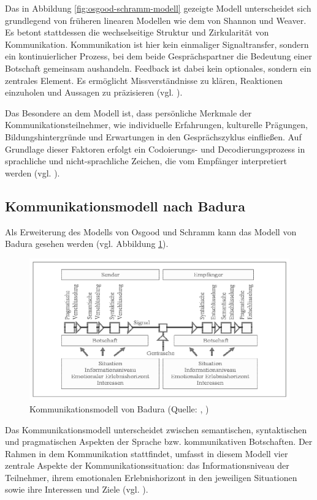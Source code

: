 Das in Abbildung \ref{fig:osgood-schramm-modell} gezeigte Modell unterscheidet sich grundlegend von früheren linearen Modellen wie dem von Shannon und Weaver. Es betont stattdessen die wechselseitige Struktur und Zirkularität von Kommunikation. Kommunikation ist hier kein einmaliger Signaltransfer, sondern ein kontinuierlicher Prozess, bei dem beide Gesprächspartner die Bedeutung einer Botschaft gemeinsam aushandeln. Feedback ist dabei kein optionales, sondern ein zentrales Element. Es ermöglicht Missverständnisse zu klären, Reaktionen einzuholen und Aussagen zu präzisieren (vgl. \citealp{kumar_osgood_2024}). 

Das Besondere an dem Modell ist, dass persönliche Merkmale der Kommunikationsteilnehmer, wie individuelle Erfahrungen, kulturelle Prägungen, Bildungshintergründe und Erwartungen in den Gesprächszyklus einfließen. Auf Grundlage dieser Faktoren erfolgt ein Codoierungs- und Decodierungsprozess in sprachliche und nicht-sprachliche Zeichen, die vom Empfänger interpretiert werden (vgl. \citealp{kumar_osgood_2024}). 

\subsection{Kommunikationsmodell nach Badura}
Als Erweiterung des Modells von Osgood und Schramm kann das Modell von Badura gesehen werden (vgl. Abbildung \ref{fig:badura-modell}).

\begin{figure}[ht]
\centering
\includegraphics[width=1\linewidth]{content/pictures/badura.PNG}
\caption{Kommunikationsmodell von Badura (Quelle: \cite{badura_kommunikation_1992}, \cite[S. 93]{scheufele_kommunikation_2007})}
\label{fig:badura-modell}
\end{figure}

Das Kommunikationsmodell unterscheidet zwischen semantischen, syntaktischen und pragmatischen Aspekten der Sprache bzw. kommunikativen Botschaften. Der Rahmen in dem Kommunikation stattfindet, umfasst in diesem Modell vier zentrale Aspekte der Kommunikationssituation: das Informationsniveau der Teilnehmer, ihrem emotionalen Erlebnishorizont in den jeweiligen Situationen sowie ihre Interessen und Ziele (vgl. \citealp[S. 93]{scheufele_kommunikation_2007}).

